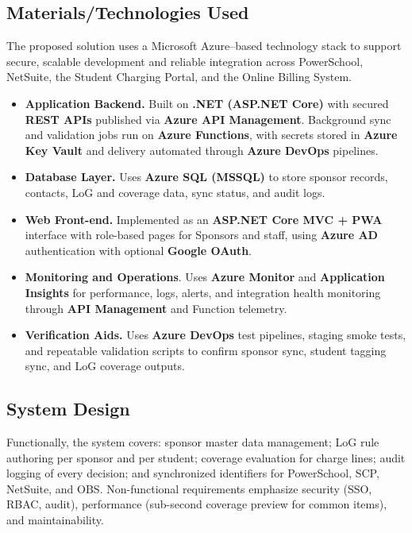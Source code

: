         \subsection{Materials/Technologies Used}
        The proposed solution uses a Microsoft Azure–based technology stack to support secure, scalable development and reliable integration across PowerSchool, NetSuite, the Student Charging Portal, and the Online Billing System.
        \begin{itemize}
            \item \textbf{Application Backend.} Built on \textbf{.NET (ASP.NET Core)} with secured \textbf{REST APIs} published via \textbf{Azure API Management}. Background sync and validation jobs run on \textbf{Azure Functions}, with secrets stored in \textbf{Azure Key Vault} and delivery automated through \textbf{Azure DevOps} pipelines.
            \item \textbf{Database Layer.} Uses \textbf{Azure SQL (MSSQL)} to store sponsor records, contacts, LoG and coverage data, sync status, and audit logs.
            \item \textbf{Web Front-end.} Implemented as an \textbf{ASP.NET Core MVC + PWA} interface with role-based pages for Sponsors and staff, using \textbf{Azure AD} authentication with optional \textbf{Google OAuth}.
            \item \textbf{Monitoring and Operations}. Uses \textbf{Azure Monitor} and \textbf{Application Insights} for performance, logs, alerts, and integration health monitoring through \textbf{API Management} and Function telemetry.
            \item \textbf{Verification Aids.} Uses \textbf{Azure DevOps} test pipelines, staging smoke tests, and repeatable validation scripts to confirm sponsor sync, student tagging sync, and LoG coverage outputs.
        \end{itemize}

 
        \subsection{System Design}
        Functionally, the system covers: sponsor master data management; LoG rule authoring per sponsor and per student; coverage evaluation for charge lines; audit logging of every decision; and synchronized identifiers for PowerSchool, SCP, NetSuite, and OBS. Non-functional requirements emphasize security (SSO, RBAC, audit), performance (sub-second coverage preview for common items), and maintainability.


